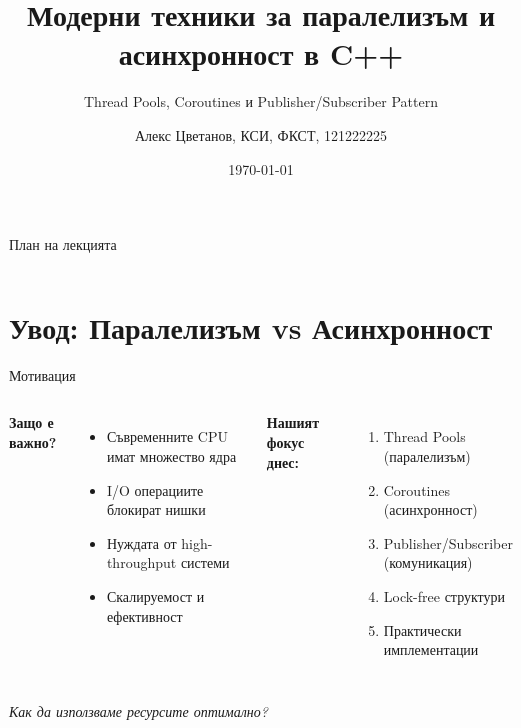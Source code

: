 \documentclass[aspectratio=169]{beamer}
\title{Модерни техники за паралелизъм и асинхронност в C++}
\subtitle{Thread Pools, Coroutines и Publisher/Subscriber Pattern}
\author{Алекс Цветанов, КСИ, ФКСТ, 121222225}
\institute{Паралелно програмиране}
\date{\today}
\begin{document}
\begin{frame}
\titlepage
\end{frame}

\begin{frame}{План на лекцията}
\begin{columns}[t]
\tableofcontents[sections={1-3}]

\tableofcontents[sections={4-6}]
\end{columns}
\end{frame}

\section{Увод: Паралелизъм vs Асинхронност}

\begin{frame}{Мотивация}
\begin{columns}
\textbf{Защо е важно?}
\begin{itemize}
    \item Съвременните CPU имат множество ядра
    \item I/O операциите блокират нишки
    \item Нуждата от high-throughput системи
    \item Скалируемост и ефективност
\end{itemize}

\textbf{Нашият фокус днес:}
\begin{enumerate}
    \item Thread Pools (паралелизъм)
    \item Coroutines (асинхронност)
    \item Publisher/Subscriber (комуникация)
    \item Lock-free структури
    \item Практически имплементации
\end{enumerate}
\end{columns}

\vspace{0.5cm}
\centering
\textit{Как да използваме ресурсите оптимално?}
\end{frame}
\end{document}
